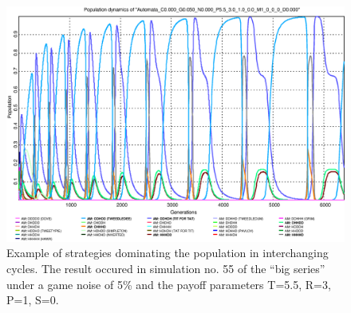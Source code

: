 \begin{figure}
\begin{center}
\includegraphics[width=20cm]{images/SimulationBS055_refined.eps}
  \caption{\label{SimExample3} Example of strategies dominating the population
    in interchanging cycles. The result occured in simulation no. 55 of the
``big series'' under a game noise of 5\% and the payoff parameters T=5.5, R=3,
P=1, S=0.}
\end{center}
\end{figure}


